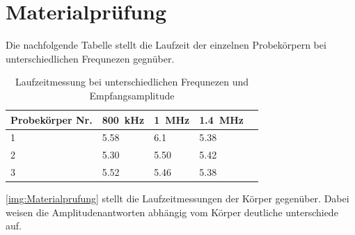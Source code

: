 \section{Materialprüfung}

Die nachfolgende Tabelle stellt die Laufzeit der einzelnen Probekörpern bei unterschiedlichen Frequnezen gegnüber. 


\begin{table}[H]
    \centering
    \begin{tabular}{l|llll}
         Probekörper Nr. &  \SI{800}{kHz} & \SI{1}{MHz} & \SI{1.4}{MHz} &  \\
         \hline
         1 & 5.58  & 6.1  & 5.38 &   \\
         2 & 5.30  & 5.50 & 5.42 &  \\
         3 & 5.52  & 5.46 & 5.38 &  
    \end{tabular}
    \caption{Laufzeitmessung bei unterschiedlichen Frequnezen und Empfangsamplitude}
    \label{tab:Materialprüfung}
\end{table}


\autoref{img:Materialprufung} stellt die Laufzeitmessungen der Körper gegenüber. Dabei weisen die Amplitudenantworten abhängig vom Körper deutliche unterschiede auf.


